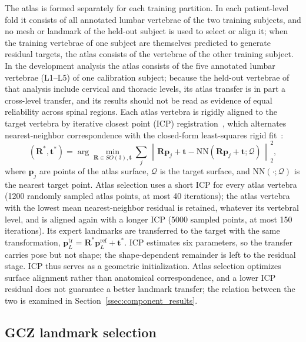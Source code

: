 \documentclass[5p,times,twocolumn,authoryear]{elsarticle}
\newif\ifhighlight
\newcommand{\rev}[1]{\ifhighlight{\color{revcolor}#1}\else#1\fi}
\begin{document}
The atlas is formed separately for each training partition. In each patient-level fold it consists of all annotated lumbar vertebrae of the two training subjects, and no mesh or landmark of the held-out subject is used to select or align it; when the training vertebrae of one subject are themselves predicted to generate residual targets, the atlas consists of the vertebrae of the other training subject. In the development analysis the atlas consists of the five annotated lumbar vertebrae (L1--L5) of one calibration subject; because the held-out vertebrae of that analysis include cervical and thoracic levels, its atlas transfer is in part a cross-level transfer, and its results should not be read as evidence of equal reliability across spinal regions. Each atlas vertebra is rigidly aligned to the target vertebra by iterative closest point (ICP) registration~\citep{besl1992,chen1992}, which alternates nearest-neighbor correspondence with the closed-form least-squares rigid fit~\citep{umeyama1991}:
\begin{equation}
  (\mathbf{R}^*,\mathbf{t}^*) =
  \arg\min_{\mathbf{R}\in SO(3),\mathbf{t}}
  \sum_j \left\|\mathbf{R}\mathbf{p}_j+\mathbf{t}-
  \mathrm{NN}(\mathbf{R}\mathbf{p}_j+\mathbf{t};\mathcal{Q})\right\|_2^2 ,
  \label{eq:icp}
\end{equation}
where $\mathbf{p}_j$ are points of the atlas surface, $\mathcal{Q}$ is the target surface, and $\mathrm{NN}(\cdot;\mathcal{Q})$ is the nearest target point. Atlas selection uses a short ICP for every atlas vertebra (1200 randomly sampled atlas points, at most 40 iterations); the atlas vertebra with the lowest mean nearest-neighbor residual is retained, whatever its vertebral level, and is aligned again with a longer ICP (5000 sampled points, at most 150 iterations). Its expert landmarks are transferred to the target with the same transformation, $\mathbf{p}^{\mathrm{tr}}_L = \mathbf{R}^{*}\mathbf{p}^{\mathrm{ref}}_L + \mathbf{t}^{*}$. ICP estimates six parameters, so the transfer carries pose but not shape; the shape-dependent remainder is left to the residual stage. \rev{ICP thus serves as a geometric initialization. Atlas selection optimizes surface alignment rather than anatomical correspondence, and a lower ICP residual does not guarantee a better landmark transfer; the relation between the two is examined in Section~\ref{ssec:component_results}.}

\subsection{GCZ landmark selection}
\label{ssec:prediction}
\end{document}
